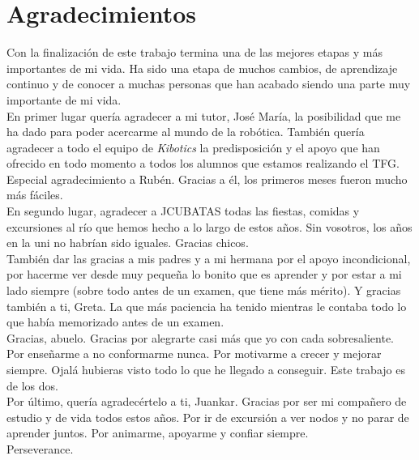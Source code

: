 \chapter*{Agradecimientos}
\vspace{-0.75cm}
\small{
Con la finalización de este trabajo termina una de las mejores etapas y más importantes de mi vida. Ha sido una etapa de muchos cambios, de aprendizaje continuo y de conocer a muchas personas que han acabado siendo una parte muy importante de mi vida. \\

En primer lugar quería agradecer a mi tutor, José María, la posibilidad que me ha dado para poder acercarme al mundo de la robótica. También quería agradecer a todo el equipo de \textit{Kibotics} la predisposición y el apoyo que han ofrecido en todo momento a todos los alumnos que estamos realizando el TFG. Especial agradecimiento a Rubén. Gracias a él, los primeros meses fueron mucho más fáciles.\\

En segundo lugar, agradecer a JCUBATAS todas las fiestas, comidas y excursiones al río que hemos hecho a lo largo de estos años. Sin vosotros, los años en la uni no habrían sido iguales. Gracias chicos. \\

También dar las gracias a mis padres y a mi hermana por el apoyo incondicional, por hacerme ver desde muy pequeña lo bonito que es aprender y por estar a mi lado siempre (sobre todo antes de un examen, que tiene más mérito). Y gracias también a ti, Greta. La que más paciencia ha tenido mientras le contaba todo lo que había memorizado antes de un examen. \\

Gracias, abuelo. Gracias por alegrarte casi más que yo con cada sobresaliente. Por enseñarme a no conformarme nunca. Por motivarme a crecer y mejorar siempre. Ojalá hubieras visto todo lo que he llegado a conseguir. Este trabajo es de los dos. \\

Por último, quería agradecértelo a ti, Juankar. Gracias por ser mi compañero de estudio y de vida todos estos años. Por ir de excursión a ver nodos y no parar de aprender juntos. Por animarme, apoyarme y confiar siempre.\\

Perseverance.
}
